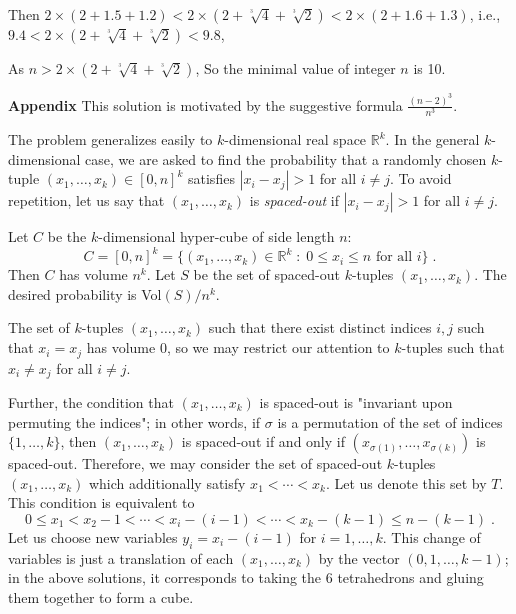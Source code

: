 \begin{enumerate}
 
Then $2\times(2+1.5+1.2)<2\times\left(2+\sqrt[^3\!]{4}+\sqrt[^3\!]{2}\right)<2\times(2+1.6+1.3)$, i.e., $9.4<2\times\left(2+\sqrt[^3\!]{4}+\sqrt[^3\!]{2}\right)<9.8$,

 As $n>2\times\left(2+\sqrt[^3\!]{4}+\sqrt[^3\!]{2}\right)$, So the minimal value of integer $n$ is 10.

 \textbf{Appendix} This solution is motivated by the suggestive formula $\frac{(n-2)^{3}}{n^{3}}$.

 The problem generalizes easily to $k$-dimensional real space $\mathbb{R}^{k}$. In the general $k$-dimensional case, we are asked to find the probability that a randomly chosen $k$-tuple $(x_{1},\dotsc,x_{k}) \in [0,n]^{k}$ satisfies $|x_{i} - x_{j}| > 1$ for all $i \ne j$. To avoid repetition, let us say that $(x_{1},\dotsc,x_{k})$ is \textit{spaced-out} if $|x_{i} - x_{j}| > 1$ for all $i \ne j$.

 Let $C$ be the $k$-dimensional hyper-cube of side length $n$: 
 \[C = [0,n]^{k} = \big\{(x_{1},\dotsc,x_{k}) \in \mathbb{R}^{k} \;:\; 0 \leqslant x_{i} \leqslant n \text{ for all }i \big\} \;.\] Then $C$ has volume $n^{k}$. Let $S$ be the set of spaced-out $k$-tuples $(x_{1},\dotsc,x_{k})$. The desired probability is Vol$(S)/n^{k}$. 

 The set of $k$-tuples $(x_{1},\dotsc,x_{k})$ such that there exist distinct indices $i, j$ such that $x_{i} = x_{j}$ has volume $0$, so we may restrict our attention to $k$-tuples such that $x_{i} \ne x_{j}$ for all $i \ne j$. 

 Further, the condition that $(x_{1},\dotsc,x_{k})$ is spaced-out is "invariant upon permuting the indices"; in other words, if $\sigma$ is a permutation of the set of indices $\{1,\dotsc,k\}$, then $(x_{1},\dotsc,x_{k})$ is spaced-out if and only if $(x_{\sigma(1)},\dotsc,x_{\sigma(k)})$ is spaced-out. Therefore, we may consider the set of spaced-out $k$-tuples $(x_{1},\dotsc,x_{k})$ which additionally satisfy $x_{1} < \dotsb < x_{k}$. Let us denote this set by $T$. This condition is equivalent to 
 \[0 \leqslant x_{1} < x_{2} - 1 < \dotsb < x_{i}-(i-1) < \dotsb < x_{k}-(k-1) \leqslant n-(k-1) \;.\]Let us choose new variables $y_{i} = x_{i} - (i-1)$ for $i = 1,\dotsc,k$. This change of variables is just a translation of each $(x_{1},\dotsc,x_{k})$ by the vector $(0,1,\dots,k-1)$; in the above solutions, it corresponds to taking the 6 tetrahedrons and gluing them together to form a cube. 


\end{enumerate}
